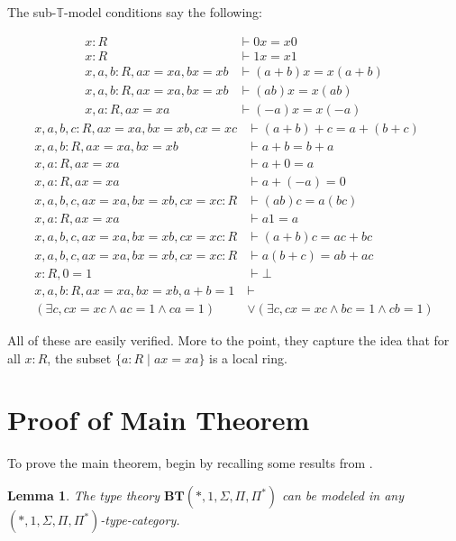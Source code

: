 \documentclass{article}
\newtheorem{lemma}[theorem]{Lemma}
\newcommand*{\T}{\mathbb{T}}
\begin{document}
The sub-\(\T\)-model conditions say the following:
\begin{tcolorbox}[colback=blue!5!white, colframe=blue!50!black]
    \begin{align*}
        x : R &\vdash 0 x = x 0
        \\ x : R &\vdash 1 x = x 1
        \\ x,a,b : R, a x = x a, b x = x b &\vdash (a + b) x = x (a + b)
        \\ x,a,b : R, a x = x a, b x = x b &\vdash (a b) x = x (a b)
        \\ x,a : R, a x = x a &\vdash (-a) x = x (-a)
    \end{align*}
    \tcblower
    \begin{align*}
        x,a,b,c : R, ax=xa, bx=xb, cx=xc &\vdash (a + b) + c = a + (b + c)
        \\ x,a,b : R, ax=xa, bx=xb &\vdash a + b = b + a
        \\ x,a : R, ax=xa &\vdash a + 0 = a
        \\ x,a : R, ax=xa &\vdash a + (-a) = 0
        \\ x,a,b,c, ax=xa, bx=xb, cx=xc : R &\vdash (ab)c = a(bc)
        \\ x,a : R, ax=xa &\vdash a1 = a
        \\ x,a,b,c, ax=xa, bx=xb, cx=xc : R &\vdash (a + b) c = a c + b c
        \\ x,a,b,c, ax=xa, bx=xb, cx=xc : R &\vdash a (b + c) = a b + a c
        \\ x : R, 0 = 1 &\vdash \bot
        \\ x,a,b : R, ax=xa, bx=xb, a + b = 1 &\vdash \\
            (\exists c, cx=xc \land ac = 1 \land ca = 1) &\lor
            (\exists c, cx=xc \land bc = 1 \land cb = 1)        
    \end{align*}
\end{tcolorbox}

All of these are easily verified. More to the point, they capture the idea
that for all \(x : R\), the subset \(\{a : R \mid ax = xa\}\) is a local ring.

\section{Proof of Main Theorem}

To prove the main theorem, begin by recalling some results from \cite{schopp}.

\begin{lemma}
    The type theory \(\mathbf{BT}(*, 1, \Sigma, \Pi, \Pi^*)\) can be modeled in any \\
    \((*, 1, \Sigma, \Pi, \Pi^*)\)-type-category.
\end{lemma}
\end{document}
